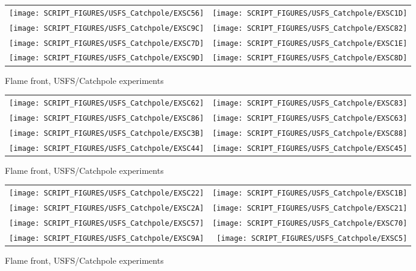 \begin{figure}[p]
\begin{tabular*}{\textwidth}{l@{\extracolsep{\fill}}r}
\texttt{[image: SCRIPT\_FIGURES/USFS\_Catchpole/EXSC56]} &
\texttt{[image: SCRIPT\_FIGURES/USFS\_Catchpole/EXSC1D]} \\
\texttt{[image: SCRIPT\_FIGURES/USFS\_Catchpole/EXSC9C]} &
\texttt{[image: SCRIPT\_FIGURES/USFS\_Catchpole/EXSC82]} \\
\texttt{[image: SCRIPT\_FIGURES/USFS\_Catchpole/EXSC7D]} &
\texttt{[image: SCRIPT\_FIGURES/USFS\_Catchpole/EXSC1E]} \\
\texttt{[image: SCRIPT\_FIGURES/USFS\_Catchpole/EXSC9D]} &
\texttt{[image: SCRIPT\_FIGURES/USFS\_Catchpole/EXSC8D]} \\
\end{tabular*}
\caption[Flame front, USFS/Catchpole experiments]{Flame front, USFS/Catchpole experiments}
\label{USFS_Catchpole_088}
\end{figure}

\begin{figure}[p]
\begin{tabular*}{\textwidth}{l@{\extracolsep{\fill}}r}
\texttt{[image: SCRIPT\_FIGURES/USFS\_Catchpole/EXSC62]} &
\texttt{[image: SCRIPT\_FIGURES/USFS\_Catchpole/EXSC83]} \\
\texttt{[image: SCRIPT\_FIGURES/USFS\_Catchpole/EXSC86]} &
\texttt{[image: SCRIPT\_FIGURES/USFS\_Catchpole/EXSC63]} \\
\texttt{[image: SCRIPT\_FIGURES/USFS\_Catchpole/EXSC3B]} &
\texttt{[image: SCRIPT\_FIGURES/USFS\_Catchpole/EXSC88]} \\
\texttt{[image: SCRIPT\_FIGURES/USFS\_Catchpole/EXSC44]} &
\texttt{[image: SCRIPT\_FIGURES/USFS\_Catchpole/EXSC45]} \\
\end{tabular*}
\caption[Flame front, USFS/Catchpole experiments]{Flame front, USFS/Catchpole experiments}
\label{USFS_Catchpole_096}
\end{figure}

\begin{figure}[p]
\begin{tabular*}{\textwidth}{l@{\extracolsep{\fill}}r}
\texttt{[image: SCRIPT\_FIGURES/USFS\_Catchpole/EXSC22]} &
\texttt{[image: SCRIPT\_FIGURES/USFS\_Catchpole/EXSC1B]} \\
\texttt{[image: SCRIPT\_FIGURES/USFS\_Catchpole/EXSC2A]} &
\texttt{[image: SCRIPT\_FIGURES/USFS\_Catchpole/EXSC21]} \\
\texttt{[image: SCRIPT\_FIGURES/USFS\_Catchpole/EXSC57]} &
\texttt{[image: SCRIPT\_FIGURES/USFS\_Catchpole/EXSC70]} \\
\texttt{[image: SCRIPT\_FIGURES/USFS\_Catchpole/EXSC9A]} &
\texttt{[image: SCRIPT\_FIGURES/USFS\_Catchpole/EXSC5]} \\
\end{tabular*}
\caption[Flame front, USFS/Catchpole experiments]{Flame front, USFS/Catchpole experiments}
\label{USFS_Catchpole_104}
\end{figure}

